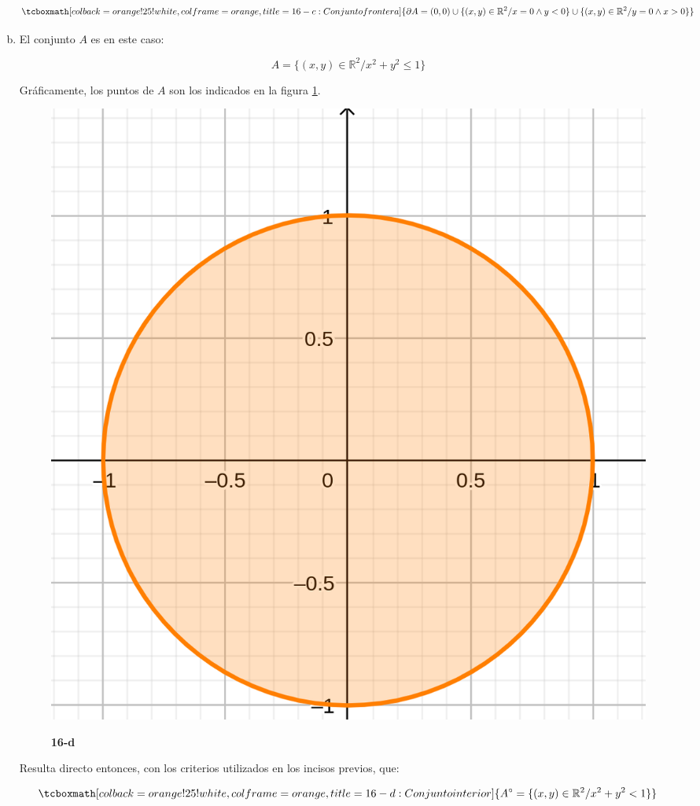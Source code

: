 \documentclass{article}
\renewcommand{\Bbb}{\mathbb}
\begin{document}
\begin{enumerate}[(a)]
\begin{equation}
\tcboxmath[colback=orange!25!white,colframe=orange, title=16-c: Conjunto frontera]
{ \partial{A} = (0,0) \cup \{ (x, y) \in \Bbb R^2 / x = 0 \wedge y < 0 \} \cup \{ (x, y) \in \Bbb R^2 / y = 0 \wedge x > 0 \} }
\end{equation}

\item El conjunto $A$ es en este caso:

\begin{equation}
A = \{ (x,y) \in \Bbb R^2 / x^2 + y^2 \leq 1 \}
\end{equation}

Gráficamente, los puntos de $A$ son los indicados en la figura \ref{fig:1-16-d}.

\begin{figure}[ht]
\caption{\textbf{16-d}}
\includegraphics[scale=2.5]{img/ejercicios/1/16-d.png} 
\centering
\label{fig:1-16-d}
\end{figure}

Resulta directo entonces, con los criterios utilizados en los incisos previos, que:

\begin{equation}
\tcboxmath[colback=orange!25!white,colframe=orange, title=16-d: Conjunto interior]
{ A^{\circ} = \{ (x, y) \in \Bbb R^2 / x^2 + y^2 < 1 \}  }
\end{equation}


\end{enumerate}
\end{document}
